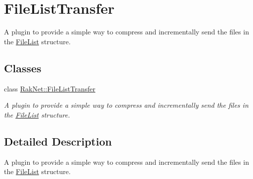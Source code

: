 \hypertarget{group___f_i_l_e___l_i_s_t___t_r_a_n_s_f_e_r___g_r_o_u_p}{\section{File\-List\-Transfer}
\label{group___f_i_l_e___l_i_s_t___t_r_a_n_s_f_e_r___g_r_o_u_p}
}


A plugin to provide a simple way to compress and incrementally send the files in the \hyperlink{class_rak_net_1_1_file_list}{File\-List} structure.  


\subsection*{Classes}
\begin{DoxyCompactItemize}
\item 
class \hyperlink{class_rak_net_1_1_file_list_transfer}{Rak\-Net\-::\-File\-List\-Transfer}
\begin{DoxyCompactList}\small\item\em A plugin to provide a simple way to compress and incrementally send the files in the \hyperlink{class_rak_net_1_1_file_list}{File\-List} structure. \end{DoxyCompactList}\end{DoxyCompactItemize}


\subsection{Detailed Description}
A plugin to provide a simple way to compress and incrementally send the files in the \hyperlink{class_rak_net_1_1_file_list}{File\-List} structure. 